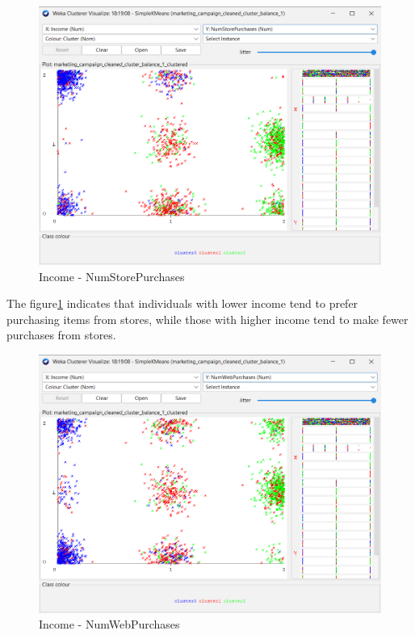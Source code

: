 \begin{figure}[H]
  \includegraphics[scale=0.6]{imgs/cluster_income_store}
  \centering
  \caption{Income - NumStorePurchases}
  \label{NumStorePurchases}
\end{figure}

The figure\ref{NumStorePurchases} indicates that individuals with lower income tend to prefer purchasing items from stores, while those with higher income tend to make fewer purchases from stores.



\begin{figure}[H]
  \includegraphics[scale=0.6]{imgs/cluster_income_webbuy}
  \centering
  \caption{Income - NumWebPurchases}
  \label{NumWebPurchases}
\end{figure}

